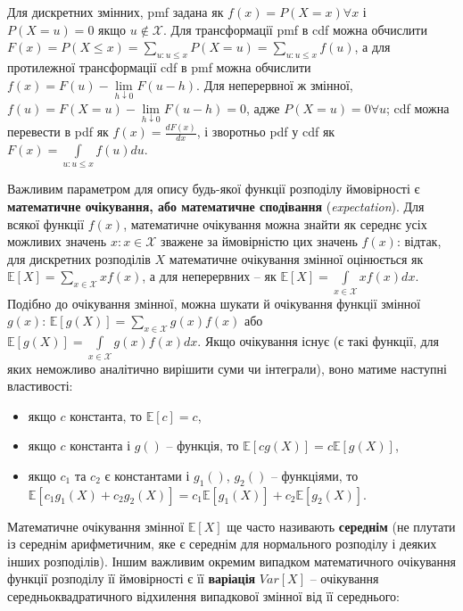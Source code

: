 \documentclass[
  11pt,
]{book}
\begin{document}
Для дискретних змінних, pmf задана як \(f(x) = P(X = x) \forall x\) і \(P(X = u) = 0\) якщо \(u \notin \mathcal{X}\). Для трансформації pmf в cdf можна обчислити \(F(x) = P(X \leq x) = \sum \limits_{u: u \leq x} P(X = u) = \sum \limits_{u: u \leq x} f(u)\), а для протилежної трансформації cdf в pmf можна обчислити \(f(x) = F(u) - \lim \limits_{h \downarrow 0} F(u - h)\). Для неперервної ж змінної, \(f(u) = F(X = u) - \lim \limits_{h \downarrow 0} F(u - h) = 0\), адже \(P(X = u) = 0 \forall u\); cdf можна перевести в pdf як \(f(x) = \frac{d F(x)}{d x}\), і зворотньо pdf у cdf як \(F(x) = \int \limits_{u: u \leq x} f(u) du\).

Важливим параметром для опису будь-якої функції розподілу ймовірності є \textbf{математичне очікування, або математичне сподівання} (\emph{expectation}). Для всякої функції \(f(x)\), математичне очікування можна знайти як середнє усіх можливих значень \(x: x \in \mathcal{X}\) зважене за ймовірністю цих значень \(f(x)\): відтак, для дискретних розподілів \(X\) математичне очікування змінної оцінюється як \(\mathbb{E}[X] = \sum \limits_{x \in \mathcal{X}} x f(x)\), а для неперервних -- як \(\mathbb{E}[X] = \int \limits_{x \in \mathcal{X}} x f(x) dx\). Подібно до очікування змінної, можна шукати й очікування функції змінної \(g(x)\): \(\mathbb{E}[g(X)] = \sum \limits_{x \in \mathcal{X}} g(x) f(x)\) або \(\mathbb{E}[g(X)] = \int \limits_{x \in \mathcal{X}} g(x) f(x) dx\). Якщо очікування існує (є такі функції, для яких неможливо аналітично вирішити суми чи інтеграли), воно матиме наступні властивості:

\begin{itemize}
\item
  якщо \(c\) константа, то \(\mathbb{E}[c] = c\),
\item
  якщо \(c\) константа і \(g()\) -- функція, то \(\mathbb{E}[c g(X)] = c \mathbb{E} [g(X)]\),
\item
  якщо \(c_1\) та \(c_2\) є константами і \(g_1()\), \(g_2()\) -- функціями, то \(\mathbb{E}[c_1 g_1 (X) + c_2 g_2(X)] = c_1 \mathbb{E}[g_1(X)] + c_2 \mathbb{E}[g_2(X)]\).
\end{itemize}

Математичне очікування змінної \(\mathbb{E}[X]\) ще часто називають \textbf{середнім} (не плутати із середнім арифметичним, яке є середнім для нормального розподілу і деяких інших розподілів). Іншим важливим окремим випадком математичного очікування функції розподілу її ймовірності є її \textbf{варіація} \(Var[X]\) -- очікування середньоквадратичного відхилення випадкової змінної від її середнього:
\end{document}
